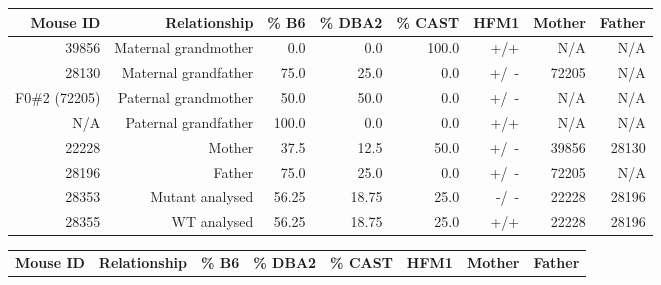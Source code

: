 \begin{table}[p]
	\begin{subtable}[h]{\textwidth}
		
		\centering
		\begin{adjustbox}{width = 1\textwidth}
			\begin{tabular}{rrrrrrrr}

				\toprule
				\textbf{Mouse ID} & \textbf{Relationship} & \textbf{\% B6} & \textbf{\% DBA2} & \textbf{\% CAST} & \textbf{HFM1} & \textbf{Mother} & \textbf{Father} \\

				\midrule
				39856   & Maternal grandmother  & 0.0   & 0.0   & 100.0 & +/+ & N/A    & N/A \\
				28130   & Maternal grandfather  & 75.0  & 25.0  & 0.0   & +/~- & 72205 & N/A \\
				F0\#2 (72205)   & Paternal grandmother  & 50.0  & 50.0  & 0.0   & +/~- & N/A    & N/A \\
				N/A      & Paternal grandfather  & 100.0 & 0.0   & 0.0   & +/+ & N/A    & N/A \\
				\midrule
				22228   & Mother                & 37.5  & 12.5  & 50.0  & +/~- & 39856 & 28130 \\
				28196   & Father                & 75.0  & 25.0  & 0.0   & +/~- & 72205 & N/A \\
				\midrule
				28353   & Mutant analysed       & 56.25 & 18.75 & 25.0  & -/~- & 22228 & 28196 \\
				28355   & WT analysed           & 56.25 & 18.75 & 25.0  & +/+ & 22228 & 28196 \\
				\bottomrule

			\end{tabular}
		\end{adjustbox}
\label{tab:ancestry-28353-28355}
	\end{subtable}
	\vspace{2cm}


	\begin{subtable}[h]{\textwidth}

		\centering
		\begin{adjustbox}{width = 1\textwidth}
			\begin{tabular}{rrrrrrrr}

				\toprule
				\textbf{Mouse ID} & \textbf{Relationship} & \textbf{\% B6} & \textbf{\% DBA2} & \textbf{\% CAST} & \textbf{HFM1} & \textbf{Mother} & \textbf{Father} \\


\end{tabular}
\end{adjustbox}
\end{subtable}
\end{table}
